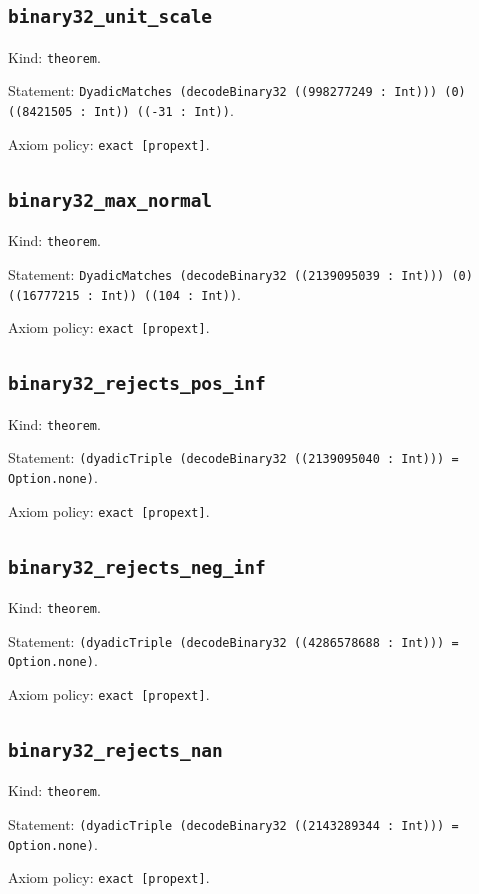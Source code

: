 \documentclass[11pt]{article}
\begin{document}
\subsection*{\texttt{binary32\_unit\_scale}}
\noindent Kind: \texttt{theorem}.\par
\noindent Statement: \texttt{DyadicMatches (decodeBinary32 ((998277249 : Int))) (0) ((8421505 : Int)) ((-31 : Int))}.\par
\noindent Axiom policy: \texttt{exact [propext]}.\par
\subsection*{\texttt{binary32\_max\_normal}}
\noindent Kind: \texttt{theorem}.\par
\noindent Statement: \texttt{DyadicMatches (decodeBinary32 ((2139095039 : Int))) (0) ((16777215 : Int)) ((104 : Int))}.\par
\noindent Axiom policy: \texttt{exact [propext]}.\par
\subsection*{\texttt{binary32\_rejects\_pos\_inf}}
\noindent Kind: \texttt{theorem}.\par
\noindent Statement: \texttt{(dyadicTriple (decodeBinary32 ((2139095040 : Int))) = Option.none)}.\par
\noindent Axiom policy: \texttt{exact [propext]}.\par
\subsection*{\texttt{binary32\_rejects\_neg\_inf}}
\noindent Kind: \texttt{theorem}.\par
\noindent Statement: \texttt{(dyadicTriple (decodeBinary32 ((4286578688 : Int))) = Option.none)}.\par
\noindent Axiom policy: \texttt{exact [propext]}.\par
\subsection*{\texttt{binary32\_rejects\_nan}}
\noindent Kind: \texttt{theorem}.\par
\noindent Statement: \texttt{(dyadicTriple (decodeBinary32 ((2143289344 : Int))) = Option.none)}.\par
\noindent Axiom policy: \texttt{exact [propext]}.\par
\end{document}
